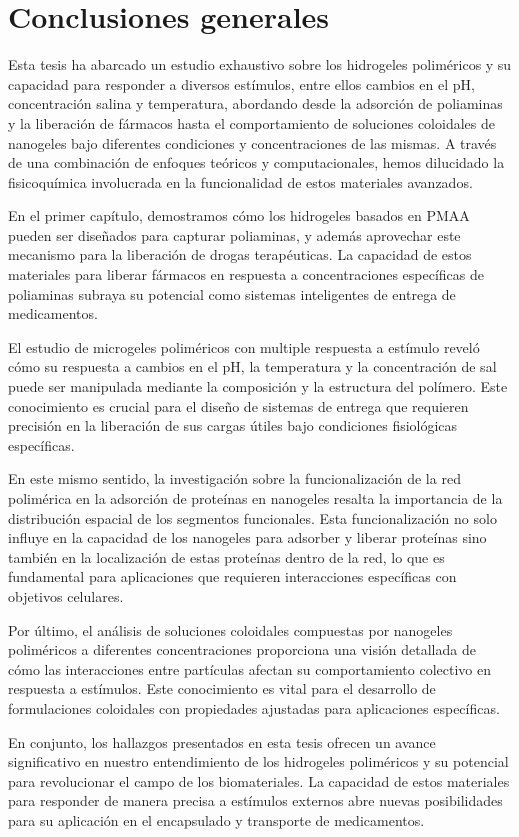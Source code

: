 \chapter{Conclusiones generales}

Esta tesis ha abarcado un estudio exhaustivo sobre los hidrogeles polim\'ericos y su capacidad para responder a diversos est\'imulos, entre ellos cambios en el pH, concentraci\'on salina y temperatura, abordando desde la adsorci\'on de poliaminas y la liberaci\'on de f\'armacos hasta el comportamiento de soluciones coloidales de nanogeles bajo diferentes condiciones y concentraciones de las mismas. A trav\'es de una combinaci\'on de enfoques te\'oricos y computacionales, hemos dilucidado la fisicoqu\'imica involucrada en la funcionalidad de estos materiales avanzados.

En el primer cap\'itulo, demostramos c\'omo los hidrogeles basados en PMAA pueden ser dise\~nados para capturar poliaminas, y adem\'as aprovechar este mecanismo para la liberaci\'on de drogas terap\'euticas. La capacidad de estos materiales para liberar f\'armacos en respuesta a concentraciones espec\'ificas de poliaminas subraya su potencial como sistemas inteligentes de entrega de medicamentos.

El estudio de microgeles polim\'ericos con multiple respuesta a est\'imulo revel\'o c\'omo su respuesta a cambios en el pH, la temperatura y la concentraci\'on de sal puede ser manipulada mediante la composici\'on y la estructura del pol\'imero. Este conocimiento es crucial para el dise\~no de sistemas de entrega que requieren precisi\'on en la liberaci\'on de sus cargas \'utiles bajo condiciones fisiol\'ogicas espec\'ificas.

En este mismo sentido, la investigaci\'on sobre la funcionalizaci\'on de la red polim\'erica en la adsorci\'on de prote\'inas en nanogeles resalta la importancia de la distribuci\'on espacial de los segmentos funcionales. Esta funcionalizaci\'on no solo influye en la capacidad de los nanogeles para adsorber y liberar prote\'inas sino tambi\'en en la localizaci\'on de estas prote\'inas dentro de la red, lo que es fundamental para aplicaciones que requieren interacciones espec\'ificas con objetivos celulares.

Por \'ultimo, el an\'alisis de soluciones coloidales compuestas por nanogeles polim\'ericos a diferentes concentraciones proporciona una visi\'on detallada de c\'omo las interacciones entre part\'iculas afectan su comportamiento colectivo en respuesta a est\'imulos. Este conocimiento es vital para el desarrollo de formulaciones coloidales con propiedades ajustadas para aplicaciones espec\'ificas.

En conjunto, los hallazgos presentados en esta tesis ofrecen un avance significativo en nuestro entendimiento de los hidrogeles polim\'ericos y su potencial para revolucionar el campo de los biomateriales. La capacidad de estos materiales para responder de manera precisa a est\'imulos externos abre nuevas posibilidades para su aplicaci\'on en el encapsulado y transporte de medicamentos.